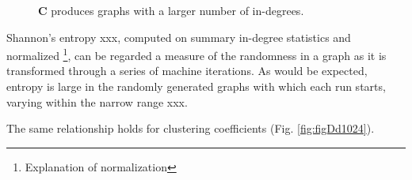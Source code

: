 \documentclass[twoside,twocolumn]{article}
\begin{document}
\begin{figure}
  \caption{\textbf{C} produces graphs with a larger number of in-degrees.}
  \label{fig:figB}
\end{figure}

Shannon's entropy xxx, computed on summary in-degree statistics and normalized
\footnote{Explanation of normalization}, can be
regarded a measure of the randomness in a graph as it is transformed
through a series of machine iterations. As would be expected, entropy is
large in the randomly generated graphs with which each run starts, varying
within the narrow range xxx.

The same relationship holds for clustering coefficients (Fig. \ref{fig:figDd1024}).
\end{document}
